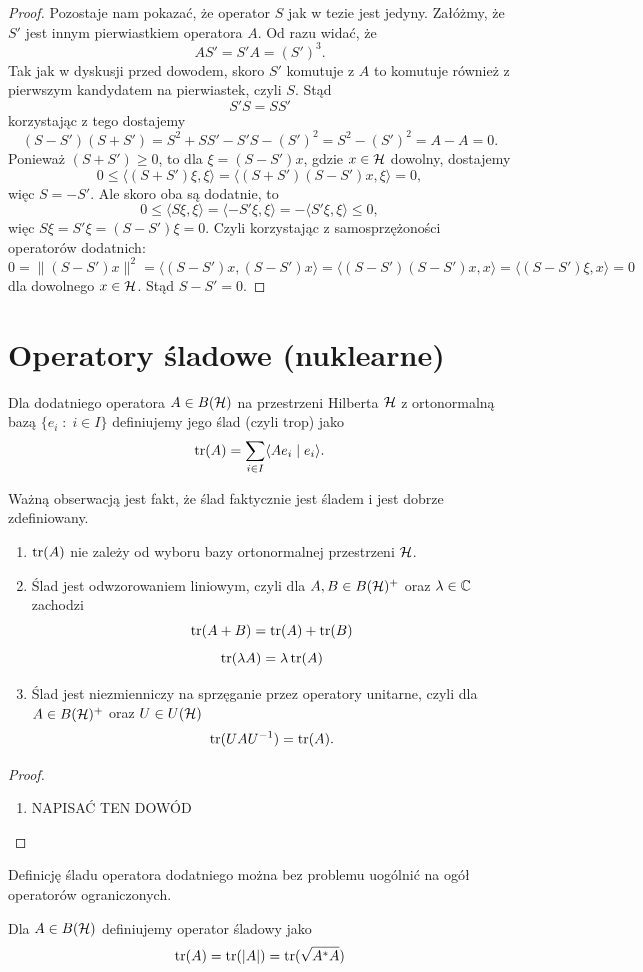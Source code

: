 \begin{proof}
  Pozostaje nam pokazać, że operator $S$ jak w tezie jest jedyny. Załóżmy, że $S'$ jest innym pierwiastkiem operatora $A$. Od razu widać, że
  $$AS'=S'A=(S')^3.$$
  Tak jak w dyskusji przed dowodem, skoro $S'$ komutuje z $A$ to komutuje również z pierwszym kandydatem na pierwiastek, czyli $S$. Stąd
  $$S'S=SS'$$
  korzystając z tego dostajemy
  $$(S-S')(S+S')=S^2+SS'-S'S-(S')^2=S^2-(S')^2=A-A=0.$$
  Ponieważ $(S+S')\geq 0$, to dla $\xi=(S-S')x$, gdzie $x\in\operatorname{\mathcal{H}}$ dowolny, dostajemy
  $$0\leq \langle(S+S')\xi, \xi\rangle=\langle (S+S')(S-S')x,\xi\rangle=0,$$
  więc $S=-S'$. Ale skoro oba są dodatnie, to 
  $$0\leq \langle S\xi,\xi\rangle=\langle -S'\xi,\xi\rangle=-\langle S' \xi,\xi\rangle\leq 0,$$
  więc $S\xi=S'\xi=(S-S')\xi=0$. Czyli korzystając z samosprzężoności operatorów dodatnich:
  $$0=\|(S-S')x\|^2=\langle (S-S')x,(S-S')x\rangle=\langle(S-S')(S-S')x,x\rangle=\langle (S-S')\xi, x\rangle=0$$
  dla dowolnego $x\in\operatorname{\mathcal{H}}$. Stąd $S-S'=0$.
\end{proof}


\section{Operatory śladowe (nuklearne)}

\begin{definition}{}{}
  Dla dodatniego operatora $A\in B(\operatorname{\mathcal{H}})$ na przestrzeni Hilberta $\operatorname{\mathcal{H}}$ z ortonormalną bazą $\{e_i\;:\;i\in I\}$ definiujemy jego ślad (czyli trop) jako
  $$\operatorname{tr}(A)=\sum_{i\in I}\langle Ae_i\;|\;e_i\rangle.$$
\end{definition}

Ważną obserwacją jest fakt, że ślad faktycznie jest śladem i jest dobrze zdefiniowany.

\begin{lemma}{}{}\mbox{}
  \begin{enumerate}
    \item $\operatorname{tr}(A)$ nie zależy od wyboru bazy ortonormalnej przestrzeni $\operatorname{\mathcal{H}}$.
    \item Ślad jest odwzorowaniem liniowym, czyli dla $A,B\in B(\operatorname{\mathcal{H}})^+$ oraz $\lambda\in\mathbb{C}$ zachodzi
      $$\operatorname{tr}(A+B)=\operatorname{tr}(A)+\operatorname{tr}(B)$$
      $$\operatorname{tr}(\lambda A)=\lambda\operatorname{tr}(A)$$
    \item Ślad jest niezmienniczy na sprzęganie przez operatory unitarne, czyli dla $A\in B(\operatorname{\mathcal{H}})^+$ oraz $U\in U(\operatorname{\mathcal{H}})$
      $$\operatorname{tr}(UAU^{-1})=\operatorname{tr}(A).$$
  \end{enumerate}
\end{lemma}

\begin{proof}\mbox{}
  \begin{enumerate}
    \item {\color{red}NAPISAĆ TEN DOWÓD}
  \end{enumerate}
\end{proof}

Definicję śladu operatora dodatniego można bez problemu uogólnić na ogół operatorów ograniczonych.

\begin{definition}{}{}
  Dla $A\in B(\operatorname{\mathcal{H}})$ definiujemy operator śladowy jako
  $$\operatorname{tr}(A)=\operatorname{tr}(|A|)=\operatorname{tr}(\sqrt{A^*A})$$
\end{definition}




